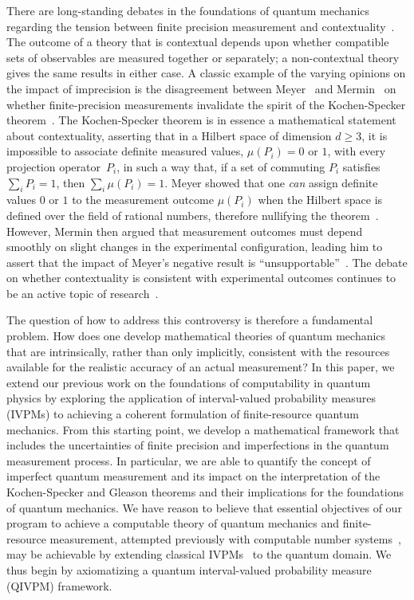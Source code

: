 \documentclass[english,reprint, aps, prl,superscriptaddress, showpacs,
showkeys, longbibliography, amsmath, amssymb]{revtex4-1}
\theoremstyle{plain}
\theoremstyle{definition}
\begin{document}
There are long-standing debates in the foundations of quantum
mechanics regarding the tension between finite precision measurement
and contextuality~\cite{BarrettKent2004,Appleby_2005}. The outcome
of a theory that is contextual depends upon
whether  compatible sets of observables are measured together or
separately; a non-contextual theory gives the same results in either
case.  A classic example of the varying opinions on the impact of
imprecision is the disagreement between
Meyer~\cite{PhysRevLett.83.3751} and 
Mermin~\cite{Mermin1999}  on whether finite-precision
measurements invalidate the spirit of the Kochen-Specker
theorem~\cite{kochenspecker1967,peres1995quantum}.  The Kochen-Specker  
theorem is in essence a
mathematical statement about contextuality, asserting that
in a Hilbert space of dimension $d \ge 3$, it is
impossible to associate definite measured values, $\mu(P_i)= 0$ or
$1$, with every projection operator~$P_i$, in such a way that, if a
set of commuting $P_i$ satisfies $\sum_i P_i = 1$, then
$\sum_i \mu(P_i) = 1$.   Meyer showed that one {\it can\/}
assign definite values $0$ or $1$ to the measurement outcome
$\mu(P_i)$ when the Hilbert space is defined over the field of
rational numbers, therefore nullifying the
theorem~\citep{PhysRevLett.83.3751}.  However, Mermin then argued
that measurement outcomes must depend smoothly on slight changes in
the experimental configuration, leading him to assert that the
impact of Meyer's negative result is
``unsupportable''~\citep{Mermin1999}.  The debate on
whether contextuality is consistent with experimental
outcomes continues to be an active topic of research~\citep{Kent1999,HavlicekKrennSummhammerSvozil2001,SimonBruknerZeilinger2001,Cabello2002,Larsson2002,Appleby2002,BarrettKent2004,Appleby_2005,Spekkens2005,GuehneKleinmannCabelloEtAl2010,MazurekPuseyKunjwalEtAl2016}.

The question of how to address this controversy is therefore a
fundamental problem.  How does one
develop mathematical theories of quantum mechanics that are
intrinsically, rather than only implicitly, consistent with the
resources available for the realistic accuracy of an actual
measurement?   In this paper, we extend our previous work on the
foundations of computability in quantum physics by exploring the
application of interval-valued probability measures (IVPMs) to
achieving a coherent formulation of finite-resource quantum mechanics.
From this starting point, we develop a mathematical framework that includes the
uncertainties of finite precision and imperfections in the quantum
measurement process.  In particular, we are able to quantify the concept of
imperfect quantum measurement and its impact on the interpretation of
the Kochen-Specker and Gleason theorems and their implications for the
foundations of quantum mechanics.  We have reason to believe that
essential objectives of our program to achieve a computable theory of
quantum mechanics and finite-resource measurement, attempted
previously with computable number
systems~\cite{usat,geometry2013apsrev4,DQT2014}, may be achievable by
extending classical IVPMs~\cite{JamisonLodwick2004} to the quantum
domain.  We thus begin by axiomatizing a quantum interval-valued
probability measure (QIVPM) framework.
\end{document}
